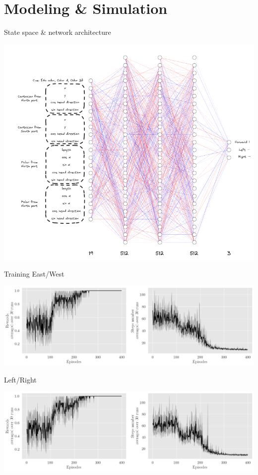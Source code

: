 \documentclass[bigger]{beamer}
\begin{document}
\section{Modeling \& Simulation}
\label{sec:org281e3c6}
\begin{frame}[label={sec:orgf9594af}]{State space \& network architecture}
\begin{center}
\includegraphics[height=0.97\textheight]{medias/state-space-nn.png}
\end{center}
\end{frame}
\begin{frame}[label={sec:org0fbdf7d}]{Training}
East/West
\begin{center}
\includegraphics[height=0.35\textheight]{medias/steps-and-rewards-EastWest.png}
\end{center}
Left/Right
\begin{center}
\includegraphics[height=0.35\textheight]{medias/steps-and-rewards-LeftRight.png}
\end{center}
\end{frame}
\end{document}

